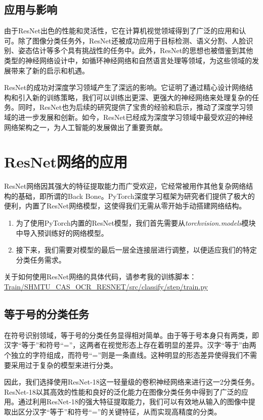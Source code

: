 \subsection{应用与影响}

由于ResNet出色的性能和灵活性，它在计算机视觉领域得到了广泛的应用和认可。除了图像分类任务外，ResNet还被成功应用于目标检测、语义分割、人脸识别、姿态估计等多个具有挑战性的任务中。此外，ResNet的思想也被借鉴到其他类型的神经网络设计中，如循环神经网络和自然语言处理等领域，为这些领域的发展带来了新的启示和机遇。

ResNet的成功对深度学习领域产生了深远的影响。它证明了通过精心设计网络结构和引入新的训练策略，我们可以训练出更深、更强大的神经网络来处理复杂的任务。同时，ResNet也为后续的研究提供了宝贵的经验和启示，推动了深度学习领域的进一步发展和创新。如今，ResNet已经成为深度学习领域中最受欢迎的神经网络架构之一，为人工智能的发展做出了重要贡献。

\section{ResNet网络的应用}

ResNet网络因其强大的特征提取能力而广受欢迎，它经常被用作其他复杂网络结构的基础，即所谓的Back Bone。PyTorch深度学习框架为研究者们提供了极大的便利，内置了ResNet网络模型，这使得我们无需从零开始手动搭建网络结构。

\begin{enumerate}
	\item 为了使用PyTorch内置的ResNet模型，我们首先需要从\textit{torchvision.models}模块中导入预训练好的网络模型。
	\item 接下来，我们需要对模型的最后一层全连接层进行调整，以便适应我们的特定分类任务需求。
\end{enumerate}

关于如何使用ResNet网络的具体代码，请参考我的训练脚本：
\url{Train/SHMTU\_CAS\_OCR\_RESNET/src/classify/step/train.py}

\subsection{等于号的分类任务}

在符号识别领域，等于号的分类任务显得相对简单。由于等于号本身只有两类，即汉字“等于”和符号“=”，这两者在视觉形态上存在着明显的差异。汉字“等于”由两个独立的字符组成，而符号“=”则是一条直线。这种明显的形态差异使得我们不需要采用过于复杂的模型来进行分类。

因此，我们选择使用ResNet-18这一轻量级的卷积神经网络来进行这一2分类任务。ResNet-18以其高效的性能和良好的泛化能力在图像分类任务中得到了广泛的应用。通过利用ResNet-18的强大特征提取能力，我们可以有效地从输入的图像中提取出区分汉字“等于”和符号“=”的关键特征，从而实现高精度的分类。

